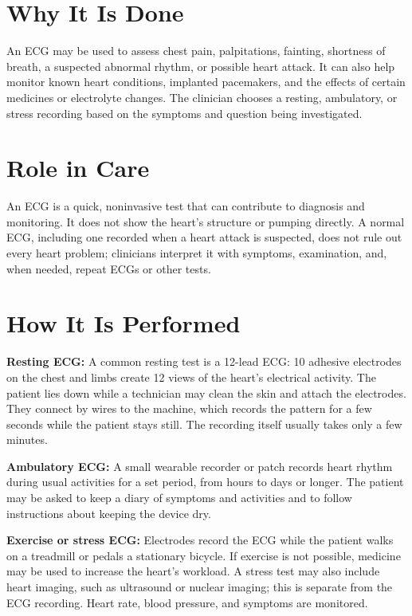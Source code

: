 \section*{Why It Is Done}
An ECG may be used to assess chest pain, palpitations, fainting, shortness of breath, a suspected abnormal rhythm, or possible heart attack. It can also help monitor known heart conditions, implanted pacemakers, and the effects of certain medicines or electrolyte changes. The clinician chooses a resting, ambulatory, or stress recording based on the symptoms and question being investigated.

\section*{Role in Care}
An ECG is a quick, noninvasive test that can contribute to diagnosis and monitoring. It does not show the heart's structure or pumping directly. A normal ECG, including one recorded when a heart attack is suspected, does not rule out every heart problem; clinicians interpret it with symptoms, examination, and, when needed, repeat ECGs or other tests.

\section*{How It Is Performed}
\textbf{Resting ECG:} A common resting test is a 12-lead ECG: 10 adhesive electrodes on the chest and limbs create 12 views of the heart's electrical activity. The patient lies down while a technician may clean the skin and attach the electrodes. They connect by wires to the machine, which records the pattern for a few seconds while the patient stays still. The recording itself usually takes only a few minutes.

\textbf{Ambulatory ECG:} A small wearable recorder or patch records heart rhythm during usual activities for a set period, from hours to days or longer. The patient may be asked to keep a diary of symptoms and activities and to follow instructions about keeping the device dry.

\textbf{Exercise or stress ECG:} Electrodes record the ECG while the patient walks on a treadmill or pedals a stationary bicycle. If exercise is not possible, medicine may be used to increase the heart's workload. A stress test may also include heart imaging, such as ultrasound or nuclear imaging; this is separate from the ECG recording. Heart rate, blood pressure, and symptoms are monitored.

